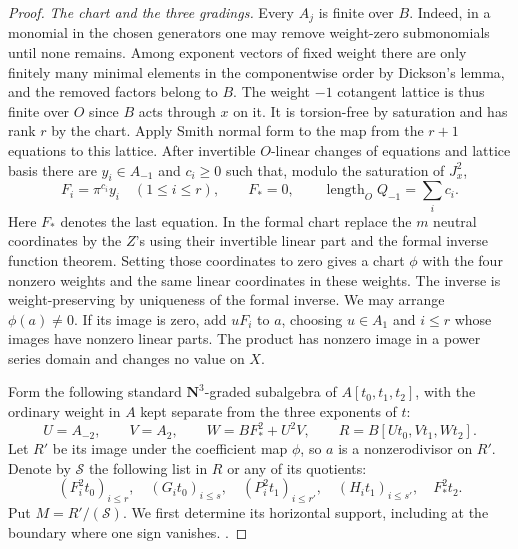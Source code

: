 \begin{proof}
\emph{The chart and the three gradings.}
Every \(A_j\) is finite over \(B\). Indeed, in a monomial in the
chosen generators one may remove weight-zero submonomials until
none remains. Among exponent vectors of fixed weight there are
only finitely many minimal elements in the componentwise order
by Dickson's lemma, and the removed factors belong to \(B\).
The weight \(-1\) cotangent lattice is thus finite over \(O\)
since \(B\) acts through \(x\) on it. It is torsion-free by
saturation and has rank \(r\) by the chart. Apply Smith normal
form to the map from the \(r+1\) equations to this lattice.
After invertible \(O\)-linear changes of equations and lattice basis
there are \(y_i\in A_{-1}\) and \(c_i\ge0\) such that, modulo
the saturation of \(J_x^2\),
\[
 F_i=\pi^{c_i}y_i\quad(1\le i\le r),\qquad F_*=0,\qquad
 \operatorname{length}_O Q_{-1}=\sum_i c_i .
\]
Here \(F_*\) denotes the last equation. In the formal chart replace
the \(m\) neutral coordinates by the \(Z\)'s using their invertible
linear part and the formal inverse function theorem. Setting those
coordinates to zero gives a chart \(\phi\) with the four nonzero
weights and the same linear coordinates in these weights. The inverse
is weight-preserving by uniqueness of the formal inverse. We may
arrange \(\phi(a)\ne0\). If its image is zero, add \(uF_i\) to \(a\),
choosing \(u\in A_1\) and \(i\le r\) whose images have nonzero linear
parts. The product has nonzero image in a power series domain and
changes no value on \(X\).

Form the following standard \(\mathbf N^3\)-graded subalgebra
of \(A[t_0,t_1,t_2]\), with the ordinary weight in \(A\) kept
separate from the three exponents of \(t\):
\[
 U=A_{-2},\qquad V=A_2,\qquad W=BF_*^2+U^2V,\qquad
 R=B[Ut_0,Vt_1,Wt_2].
\]
Let \(R'\) be its image under the coefficient map \(\phi\), so
\(a\) is a nonzerodivisor on \(R'\). Denote by \(\mathcal S\) the
following list in \(R\) or any of its quotients:
\[
 (F_i^2t_0)_{i\le r},\quad (G_i t_0)_{i\le s},\quad
 (P_i^2t_1)_{i\le r'},\quad (H_i t_1)_{i\le s'},\quad F_*^2t_2 .
\]
Put \(M=R'/(\mathcal S)\). We first determine its horizontal
support, including at the boundary where one sign vanishes.
.


\end{proof}

